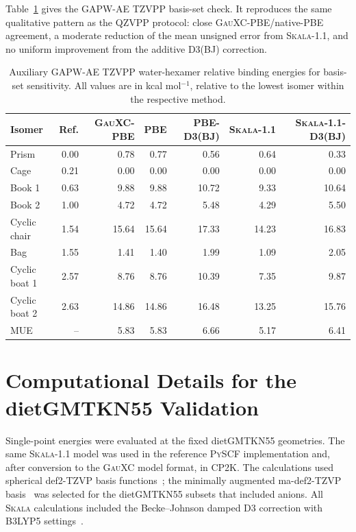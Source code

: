 \documentclass[10pt]{article}
\newcommand{\Skala}{\textsc{Skala}}
\newcommand{\PySCF}{\textsc{PySCF}}
\newcommand{\GauXC}{\textsc{GauXC}}
\newcommand{\CPtwoK}{\textsc{CP2K}}
\newcommand{\GAPW}{\textsc{GAPW}}
\newcommand{\GAPWAE}{\GAPW{}-AE}
\newcommand{\SITableFont}{\normalsize}
\begin{document}
Table~\ref{tab:si_gapw_tzvpp_hexamer} gives the \GAPWAE{} TZVPP basis-set check.  It reproduces the same qualitative pattern as the QZVPP protocol: close \GauXC{}-PBE/native-PBE agreement, a moderate reduction of the mean unsigned error from \Skala{}-1.1, and no uniform improvement from the additive D3(BJ) correction.

\begin{table}[htbp]
\centering
\SITableFont
\setlength{\tabcolsep}{3pt}
\caption{Auxiliary \GAPWAE{} TZVPP water-hexamer relative binding energies for basis-set sensitivity.  All values are in kcal mol\(^{-1}\), relative to the lowest isomer within the respective method.}
\label{tab:si_gapw_tzvpp_hexamer}
\begin{tabular}{lrrrrrr}
\hline
Isomer & Ref. & \GauXC{}-PBE & PBE & PBE-D3(BJ) & \Skala{}-1.1 & \Skala{}-1.1-D3(BJ)\\
\hline
Prism & 0.00 & 0.78 & 0.77 & 0.56 & 0.64 & 0.33\\
Cage & 0.21 & 0.00 & 0.00 & 0.00 & 0.00 & 0.00\\
Book 1 & 0.63 & 9.88 & 9.88 & 10.72 & 9.33 & 10.64\\
Book 2 & 1.00 & 4.72 & 4.72 & 5.48 & 4.29 & 5.50\\
Cyclic chair & 1.54 & 15.64 & 15.64 & 17.33 & 14.23 & 16.83\\
Bag & 1.55 & 1.41 & 1.40 & 1.99 & 1.09 & 2.05\\
Cyclic boat 1 & 2.57 & 8.76 & 8.76 & 10.39 & 7.35 & 9.87\\
Cyclic boat 2 & 2.63 & 14.86 & 14.86 & 16.48 & 13.25 & 15.76\\
\hline
MUE & -- & 5.83 & 5.83 & 6.66 & 5.17 & 6.41\\
\hline
\end{tabular}
\end{table}
\endgroup



\section{{Computational Details for the dietGMTKN55 Validation}}

Single-point energies were evaluated at the fixed dietGMTKN55 geometries.  The same \Skala{}-1.1 model was used in the reference \PySCF{} implementation and, after conversion to the \GauXC{} model format, in \CPtwoK{}.  The calculations used spherical def2-TZVP basis functions~\cite{Weigend2005}; the minimally augmented ma-def2-TZVP basis~\cite{Zheng2011} was selected for the dietGMTKN55 subsets that included anions.  All \Skala{} calculations included the Becke--Johnson damped D3 correction with B3LYP5 settings~\cite{Grimme2010DFTD3,Grimme2011D3BJ}.
\end{document}
